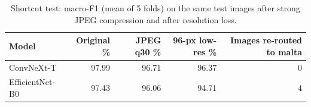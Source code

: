 \begin{table}
\caption{Shortcut test: macro-F1 (mean of 5 folds) on the same test images after strong JPEG compression and after resolution loss.}
\label{tab:table_shortcut}
\begin{tabular}{lrrrr}
\toprule
Model & Original \% & JPEG q30 \% & 96-px low-res \% & Images re-routed to malta \\
\midrule
ConvNeXt-T & 97.99 & 96.71 & 96.37 & 0 \\
EfficientNet-B0 & 97.43 & 96.06 & 94.71 & 4 \\
\bottomrule
\end{tabular}
\end{table}

